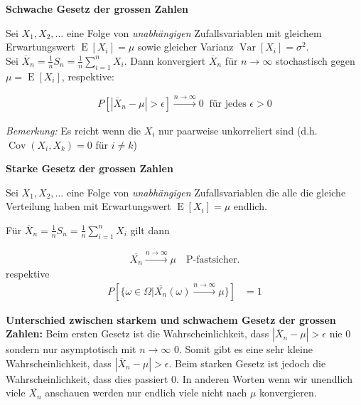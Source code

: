 \documentclass[25pt]{sciposter}
\newcommand{\Var}{\operatorname{Var}}
\newcommand{\E}{\operatorname{E}}
\newenvironment{method}[1]{\begin{mdframed}[backgroundcolor=blue!10,innertopmargin=15pt, innerbottommargin=15pt,nobreak=true]
		\textbf{#1 }
	}
	{ 
	\end{mdframed}
}
\begin{document}
\begin{multicols}{3}
		
		\begin{method}{Schwache Gesetz der grossen Zahlen}
			Sei $X_1,X_2,\ldots$ eine Folge von \textit{unabhängigen} Zufallsvariablen mit gleichem Erwartungswert $\E[X_i] = \mu$ sowie gleicher Varianz $\Var[X_i] = \sigma^2$.\\
			
			
			Sei $\overline{X}_n = \frac{1}{n}S_n = \frac{1}{n} \sum_{i=1}^{n} X_i$. Dann konvergiert $\overline{X}_n$ für $n\to\infty $ stochastisch gegen $\mu = \E[X_i]$, respektive:
			
			\begin{align*}
				P[|\overline{X}_n - \mu|> \epsilon] \stackrel{n\to\infty}{\longrightarrow}   0 \ \text{ für jedes }\epsilon > 0
			\end{align*}
			
			\textit{Bemerkung:} Es reicht wenn die $X_i$ nur paarweise unkorreliert sind (d.h. $\operatorname{Cov}(X_i,X_k) = 0$ für $i \neq k$)
			
		\end{method}
		
		
		\begin{method}{Starke Gesetz der grossen Zahlen}
			Sei $X_1,X_2,\ldots$ eine Folge von \textit{unabhängigen} Zufallsvariablen die alle die gleiche Verteilung haben mit Erwartungswert $\E[X_i] = \mu$ endlich. 
			
			Für $\overline{X}_n = \frac{1}{n}S_n = \frac{1}{n} \sum_{i=1}^{n} X_i$ gilt dann 
			
			\begin{align*}
				\overline{X_n} \stackrel{n \to \infty}{\longrightarrow} \mu \quad \text{P-fastsicher}.
			\end{align*}  
			respektive
			\begin{align*}
				P\left[ \{ \omega \in \Omega | \overline{X_n}(\omega)  \stackrel{n \to \infty}{\longrightarrow}  \mu  \} \right] &= 1
			\end{align*}
		\end{method}
		
		\textbf{Unterschied zwischen starkem und schwachem Gesetz der grossen Zahlen:} Beim ersten Gesetz ist die Wahrscheinlichkeit, dass $|\overline{X}_n - \mu|> \epsilon$ nie 0 sondern nur asymptotisch mit $n \to \infty$ 0. Somit gibt es eine sehr kleine Wahrscheinlichkeit, dass $|\overline{X}_n - \mu| > \epsilon$. Beim starken Gesetz ist jedoch die Wahrscheinlichkeit, dass dies passiert 0. In anderen Worten wenn wir unendlich viele $\overline{X_n}$ anschauen werden nur endlich viele nicht nach $\mu$ konvergieren.
		

\end{multicols}
\end{document}
